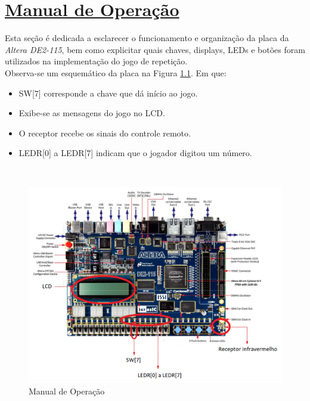 \documentclass[14pt, oneside]{book}
\newcommand\tab[1][1cm]{\hspace*{#1}}
\theoremstyle{definition}
\begin{document}
                
         \chapter[Manual de Operação]{\hyperlink{toc}{Manual de Operação}}
                \tab Esta seção é dedicada a esclarecer o funcionamento e organização da placa da \textit{Altera DE2-115}, bem como explicitar quais chaves, displays, LEDs e botões foram utilizados na implementação do jogo de repetição. \\
                \tab Observa-se um esquemático da placa na Figura \ref{manual}. Em que:
              
                \begin{itemize}
                    \item SW[7] corresponde a chave que dá início ao jogo. 
                    \item Exibe-se as mensagens do jogo no LCD.
                    \item O receptor recebe os sinais do controle remoto.
                    \item LEDR[0] a LEDR[7] indicam que o jogador digitou um número.
                \end{itemize} \\
                
                \begin{figure}[H]
                    \centering                    
                    \includegraphics[width=\columnwidth]{manual.png}
                    \caption{Manual de Operação}
                    \label{manual}
                \end{figure} \\
                
\end{document}
